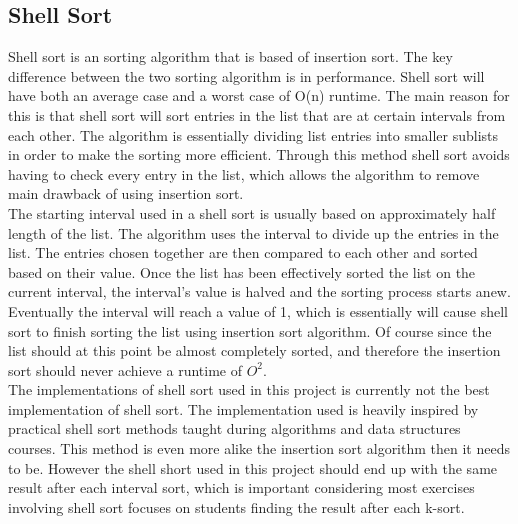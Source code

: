 \subsection{Shell Sort}
Shell sort is an sorting algorithm that is based of insertion sort. The key difference between the two sorting algorithm is in performance. Shell sort will have both an average case and a worst case of O(n) runtime. The main reason for this is that shell sort will sort entries in the list that are at certain intervals from each other. The algorithm is essentially dividing list entries into smaller sublists in order to make the sorting more efficient. Through this method shell sort avoids having to check every entry in the list, which allows the algorithm to remove main drawback of using insertion sort.
\\[11pt]
The starting interval used in a shell sort is usually based on approximately half length of the list. The algorithm uses the interval to divide up the entries in the list. The entries chosen together are then compared to each other and sorted based on their value. Once the list has been effectively sorted the list on the current interval, the interval's value is halved and the sorting process starts anew. Eventually the interval will reach a value of 1, which is essentially will cause shell sort to finish sorting the list using insertion sort algorithm. Of course since the list should at this point be almost completely sorted, and therefore the insertion sort should never achieve a runtime of $O^2$.
\\[11pt]
The implementations of shell sort used in this project is currently not the best implementation of shell sort. The implementation used is heavily inspired by practical shell sort methods taught during algorithms and data structures courses. This method is even more alike the insertion sort algorithm then it needs to be. However the shell short used in this project should end up with the same result after each interval sort, which is important considering most exercises involving shell sort focuses on students finding the result after each k-sort.  